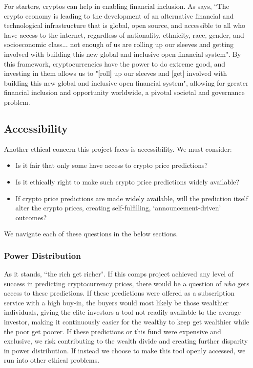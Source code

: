 \documentclass[10pt,twocolumn]{article}
\begin{document}
For starters, cryptos can help in enabling financial inclusion. As \textcite{CryptocurrenciesFinancialInclusion} says, ``The crypto economy is leading to the development of an alternative financial and technological infrastructure that is global, open source, and accessible to all who have access to the internet, regardless of nationality, ethnicity, race, gender, and socioeconomic class... not enough of us are rolling up our sleeves and getting involved with building this new global and inclusive open financial system". By this framework, cryptocurrencies have the power to do extreme good, and investing in them allows us to "[roll] up our sleeves and [get] involved with building this new global and inclusive open financial system", allowing for greater financial inclusion and opportunity worldwide, a pivotal societal and governance problem.


\subsection{Accessibility}

Another ethical concern this project faces is accessibility. We must consider:

\begin{itemize}
    \item Is it fair that only some have access to crypto price predictions?
    \item Is it ethically right to make such crypto price predictions widely available?
    \item If crypto price predictions are made widely available, will the prediction itself alter the crypto prices, creating self-fulfilling, `announcement-driven' outcomes?
\end{itemize}

We navigate each of these questions in the below sections.

\subsubsection{Power Distribution}

As it stands, ``the rich get richer". If this comps project achieved any level of success in predicting cryptocurrency prices, there would be a question of \textit{who} gets access to these predictions. If these predictions were offered as a subscription service with a high buy-in, the buyers would most likely be those wealthier individuals, giving the elite investors a tool not readily available to the average investor, making it continuously easier for the wealthy to keep get wealthier while the poor get poorer. If these predictions or this fund were expensive and exclusive, we risk contributing to the wealth divide and creating further disparity in power distribution. If instead we choose to make this tool openly accessed, we run into other ethical problems.
\end{document}
